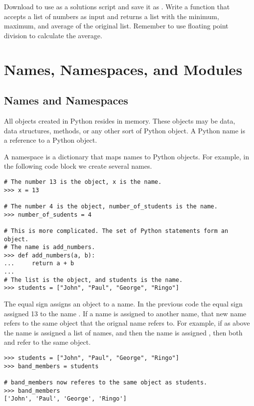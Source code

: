\begin{problem}
Download  to use as a solutions script and save it as .
Write a function that accepts a list of numbers as input and returns a list with the minimum, maximum, and average of the original list.
Remember to use floating point division to calculate the average.
\end{problem}

\section*{Names, Namespaces, and Modules}

\subsection*{Names and Namespaces}
All objects created in Python resides in memory.
These objects may be data, data structures, methods, or any other sort of Python object.
A Python name is a reference to a Python object.

A namespace is a dictionary that maps names to Python objects.
For example, in the following code block we create several names.

\begin{lstlisting}
# The number 13 is the object, x is the name.
>>> x = 13

# The number 4 is the object, number_of_students is the name.
>>> number_of_sudents = 4

# This is more complicated. The set of Python statements form an object.
# The name is add_numbers.
>>> def add_numbers(a, b):
...     return a + b
... 
# The list is the object, and students is the name.
>>> students = ["John", "Paul", "George", "Ringo"]
\end{lstlisting}

The equal sign assigns an object to a name.
In the previous code the equal sign assigned 13 to the name .
If a name is assigned to another name, that new name refers to the same object that the orignal name refers to.
For example, if as above the name  is assigned a list of names, and then the name  is assigned , then both  and  refer to the same object.

\begin{lstlisting}
>>> students = ["John", "Paul", "George", "Ringo"]
>>> band_members = students

# band_members now referes to the same object as students.
>>> band_members
['John', 'Paul', 'George', 'Ringo']
\end{lstlisting}

